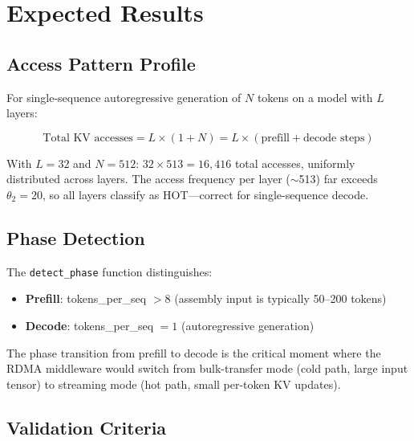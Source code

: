 \documentclass[11pt,letterpaper]{article}
\begin{document}
\section{Expected Results}
\label{sec:results}

\subsection{Access Pattern Profile}

For single-sequence autoregressive generation of $N$ tokens on a model with $L$ layers:

\begin{equation}
    \text{Total KV accesses} = L \times (1 + N) = L \times (\text{prefill} + \text{decode steps})
\end{equation}

With $L = 32$ and $N = 512$: $32 \times 513 = 16{,}416$ total accesses, uniformly distributed across layers. The access frequency per layer ($\sim$513) far exceeds $\theta_2 = 20$, so all layers classify as HOT---correct for single-sequence decode.

\subsection{Phase Detection}

The \texttt{detect\_phase} function distinguishes:
\begin{itemize}
    \item \textbf{Prefill}: tokens\_per\_seq $> 8$ (assembly input is typically 50--200 tokens)
    \item \textbf{Decode}: tokens\_per\_seq $= 1$ (autoregressive generation)
\end{itemize}

The phase transition from prefill to decode is the critical moment where the RDMA middleware would switch from bulk-transfer mode (cold path, large input tensor) to streaming mode (hot path, small per-token KV updates).

\subsection{Validation Criteria}
\end{document}
